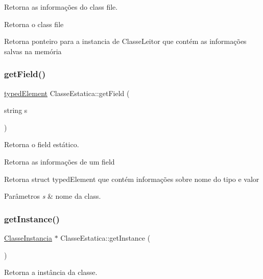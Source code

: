 Retorna as informações do class file. 

Retorna o class file \begin{DoxyReturn}{Retorna}
ponteiro para a instancia de Classe\+Leitor que contém as informações salvas na memória 
\end{DoxyReturn}
\mbox{\label{classClasseEstatica_ae85fd5cef4bbed1294562e497a6611a7}} 
\subsubsection{\texorpdfstring{get\+Field()}{getField()}}
{\footnotesize\ttfamily \hyperlink{structtypedElement__s}{typed\+Element} Classe\+Estatica\+::get\+Field (\begin{DoxyParamCaption}\item[{string}]{s }\end{DoxyParamCaption})}



Retorna o field estático. 

Retorna as informações de um field \begin{DoxyReturn}{Retorna}
struct typed\+Element que contém informações sobre nome do tipo e valor
\end{DoxyReturn}

\begin{DoxyParams}{Parâmetros}
{\em s} & nome da class. \\
\hline
\end{DoxyParams}
\mbox{\label{classClasseEstatica_a426c3626c527013a975a80146394364a}} 
\subsubsection{\texorpdfstring{get\+Instance()}{getInstance()}}
{\footnotesize\ttfamily \hyperlink{classClasseInstancia}{Classe\+Instancia} $\ast$ Classe\+Estatica\+::get\+Instance (\begin{DoxyParamCaption}{ }\end{DoxyParamCaption})}



Retorna a instância da classe. 

